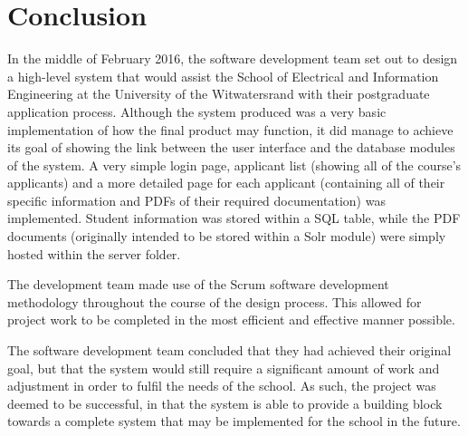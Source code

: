 \documentclass[journal]{IEEEtran}
\begin{document}
\clearpage
\thispagestyle{fancy}


\section{Conclusion}

In the middle of February 2016, the software development team set out to design a high-level system that would assist the School of Electrical and Information Engineering at the University of the Witwatersrand with their postgraduate application process. Although the system produced was a very basic implementation of how the final product may function, it did manage to achieve its goal of showing the link between the user interface and the database modules of the system. A very simple login page, applicant list (showing all of the course's applicants) and a more detailed page for each applicant (containing all of their specific information and PDFs of their required documentation) was implemented. Student information was stored within a SQL table, while the PDF documents (originally intended to be stored within a Solr module) were simply hosted within the server folder.

\hfill \break The development team made use of the Scrum software development methodology throughout the course of the design process. This allowed for project work to be completed in the most efficient and effective manner possible.

\hfill \break The software development team concluded that they had achieved their original goal, but that the system would still require a significant amount of work and adjustment in order to fulfil the needs of the school. As such, the project was deemed to be successful, in that the system is able to provide a building block towards a complete system that may be implemented for the school in the future.


\clearpage
\thispagestyle{fancy}

\end{document}
